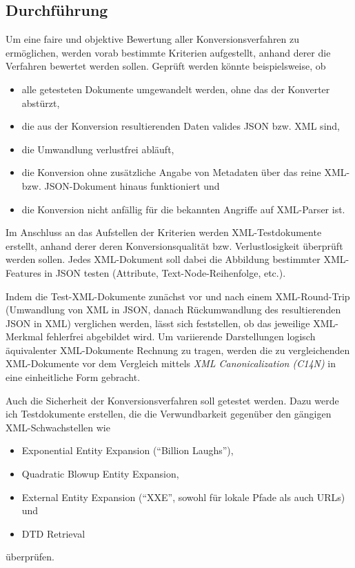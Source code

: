 \documentclass[conference]{template/IEEEtran}
\begin{document}
\subsection{Durchführung}
\label{subsec:execution}
Um eine faire und objektive Bewertung aller Konversionsverfahren zu ermöglichen,
werden vorab bestimmte Kriterien aufgestellt, anhand derer die Verfahren
bewertet werden sollen. Geprüft werden könnte beispielsweise, ob
\begin{itemize}
    \item alle getesteten Dokumente umgewandelt werden, ohne das der Konverter
          abstürzt,
    \item die aus der Konversion resultierenden Daten valides JSON bzw. XML
          sind,
    \item die Umwandlung verlustfrei abläuft,
    \item die Konversion ohne zusätzliche Angabe von Metadaten über das reine
          XML- bzw. JSON-Dokument hinaus funktioniert und
    \item die Konversion nicht anfällig für die bekannten Angriffe auf
          XML-Parser ist.
\end{itemize}

Im Anschluss an das Aufstellen der Kriterien werden XML-Testdokumente erstellt,
anhand derer deren Konversionsqualität bzw. Verlustlosigkeit überprüft werden
sollen. Jedes XML-Dokument soll dabei die Abbildung bestimmter XML-Features in
JSON testen (Attribute, Text-Node-Reihenfolge, etc.).

Indem die Test-XML-Dokumente zunächst vor und nach einem XML-Round-Trip
(Umwandlung von XML in JSON, danach Rückumwandlung des resultierenden JSON in
XML) verglichen werden, lässt sich feststellen, ob das jeweilige XML-Merkmal
fehlerfrei abgebildet wird. Um variierende Darstellungen logisch äquivalenter
XML-Dokumente Rechnung zu tragen, werden die zu vergleichenden XML-Dokumente
vor dem Vergleich mittels \emph{XML Canonicalization
(C14N)}\cite{boyer01canonicalization} in eine einheitliche Form gebracht.

Auch die Sicherheit der Konversionsverfahren soll getestet werden. Dazu werde
ich Testdokumente erstellen, die die Verwundbarkeit gegenüber den gängigen
XML-Schwachstellen\cite{morgan2014xml,spaeth2016sok} wie
\begin{itemize}
\item Exponential Entity Expansion (\enquote{Billion Laughs}),
\item Quadratic Blowup Entity Expansion,
\item External Entity Expansion (\enquote{XXE}, sowohl für lokale Pfade als auch
    URLs)\cite{steuck2002xxe} und
\item DTD Retrieval
\end{itemize}
überprüfen.
\end{document}
